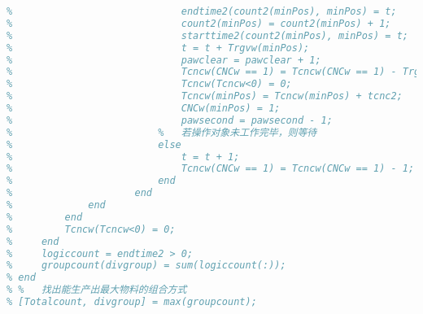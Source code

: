 \documentclass[no-math,withoutpreface,bwprint]{cumcmthesis} %
\numberwithin{equation}{section}
\numberwithin{figure}{section}
\numberwithin{table}{section}
\begin{document}
\begin{lstlisting}[language=matlab]
%                         if Tcncw(minPos) == 0
%                             endtime2(count2(minPos), minPos) = t;
%                             count2(minPos) = count2(minPos) + 1;
%                             starttime2(count2(minPos), minPos) = t;
%                             t = t + Trgvw(minPos);
%                             pawclear = pawclear + 1;
%                             Tcncw(CNCw == 1) = Tcncw(CNCw == 1) - Trgvw(minPos);
%                             Tcncw(Tcncw<0) = 0;
%                             Tcncw(minPos) = Tcncw(minPos) + tcnc2;
%                             CNCw(minPos) = 1;
%                             pawsecond = pawsecond - 1;
%                         %   若操作对象未工作完毕，则等待
%                         else
%                             t = t + 1;
%                             Tcncw(CNCw == 1) = Tcncw(CNCw == 1) - 1;
%                         end
%                     end
%             end
%         end
%         Tcncw(Tcncw<0) = 0;
%     end
%     logiccount = endtime2 > 0;
%     groupcount(divgroup) = sum(logiccount(:));
% end
% %   找出能生产出最大物料的组合方式
% [Totalcount, divgroup] = max(groupcount);
\end{lstlisting}
\end{document}
